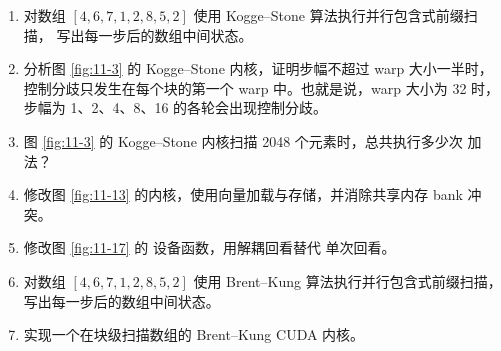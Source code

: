 \begin{enumerate}[label=\arabic*.,leftmargin=2.7em]
  \item 对数组 $[4,6,7,1,2,8,5,2]$ 使用 Kogge--Stone 算法执行并行包含式前缀扫描，
  写出每一步后的数组中间状态。

  \item 分析图 \ref{fig:11-3} 的 Kogge--Stone 内核，证明步幅不超过 warp 大小一半时，
  控制分歧只发生在每个块的第一个 warp 中。也就是说，warp 大小为 32 时，步幅为
  1、2、4、8、16 的各轮会出现控制分歧。

  \item 图 \ref{fig:11-3} 的 Kogge--Stone 内核扫描 2048 个元素时，总共执行多少次
  加法？

  \item 修改图 \ref{fig:11-13} 的内核，使用向量加载与存储，并消除共享内存 bank 冲突。

  \item 修改图 \ref{fig:11-17} 的  设备函数，用解耦回看替代
  单次回看。

  \item 对数组 $[4,6,7,1,2,8,5,2]$ 使用 Brent--Kung 算法执行并行包含式前缀扫描，
  写出每一步后的数组中间状态。

  \item 实现一个在块级扫描数组的 Brent--Kung CUDA 内核。
\end{enumerate}

